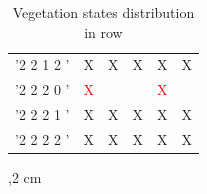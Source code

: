 \documentclass[preprint,3p,times,twocolumn]{elsarticle}
\begin{document}
\begin{table}[ht]
\begin{center}
\begin{tabular}{|p{}|p{}|p{}|p{}|p{}|p{}|}
              	  '2 2 1 2 '     & X                     & X                     & X                  & X                  & X                   \\
              	  '2 2 2 0 '     & \textcolor{red}{X}    &                       &                    & \textcolor{red}{X} &                     \\
              	  '2 2 2 1 '     & X                     & X                     & X                  & X                  & X                   \\ 
              	  '2 2 2 2 '     & X                     & X                     & X                  & X                  & X                   \\ \hline
	

\end{tabular} 
\caption{Vegetation states distribution in row}\label{tb:stepVegState}
\end{center}
\end{table}
,2 cm
\end{document}
